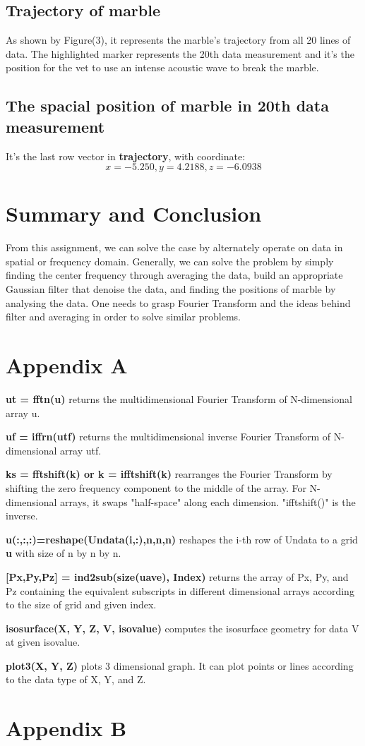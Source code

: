 \documentclass[10pt]{article}
\begin{document}
\subsection*{Trajectory of marble}
As shown by Figure(3), it represents the marble's trajectory from all 20 lines of data. The highlighted marker represents the 20th data measurement and it's the position for the vet to use an intense acoustic wave to break the marble.

\subsection*{The spacial position of marble in 20th data measurement}
It's the last row vector in \textbf{trajectory}, with coordinate:
\begin{equation}\label{7}
x=-5.250,y=4.2188,z=-6.0938
\end{equation}
\section{Summary and Conclusion}
From this assignment, we can solve the case by alternately operate on data in spatial or frequency domain. Generally, we can solve the problem by simply finding the center frequency through averaging the data, build an appropriate Gaussian filter that denoise the data, and finding the positions of marble by analysing the data. One needs to grasp Fourier Transform and the ideas behind filter and averaging in order to solve similar problems. 

\section{Appendix A}
\noindent
\textbf{ut = fftn(u)} returns the multidimensional Fourier Transform of N-dimensional array u.\par
\vskip 0.5cm
\noindent
\textbf{uf = iffrn(utf)} returns the multidimensional inverse Fourier Transform of N-dimensional array utf.\par
\vskip 0.5cm
\noindent
\textbf{ks = fftshift(k) or k = ifftshift(k)} rearranges the Fourier Transform by shifting the zero frequency component to the middle of the array. For N-dimensional arrays, it swaps "half-space" along each dimension. "ifftshift()" is the inverse. \par
\vskip 0.5cm
\noindent
\textbf{u(:,:,:)=reshape(Undata(i,:),n,n,n)} reshapes the i-th row of Undata to a grid \textbf{u} with size of n by n by n.\par
\vskip 0.5cm
\noindent
\textbf{[Px,Py,Pz] = ind2sub(size(uave), Index)} returns the array of Px, Py, and Pz containing the equivalent subscripts in different dimensional arrays according to the size of grid and given index.\par
\vskip 0.5cm
\noindent
\textbf{isosurface(X, Y, Z, V, isovalue)} computes the isosurface geometry for data V at given isovalue. \par
\vskip 0.5cm
\noindent
\textbf{plot3(X, Y, Z)} plots 3 dimensional graph. It can plot points or lines according to the data type of X, Y, and Z.
\vskip 0.5cm

\newpage

\section{Appendix B}

\end{document}
